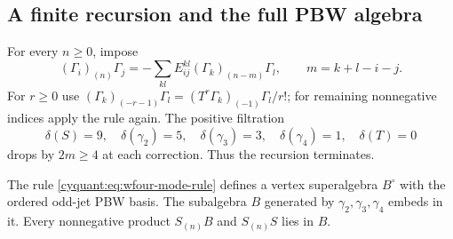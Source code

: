 \subsection{A finite recursion and the full PBW algebra}

For every $n\geq0$, impose
\begin{equation}\label{cyquant:eq:wfour-mode-rule}
 (\Gamma_i)_{(n)}\Gamma_j
   =-\sum_{kl}E_{ij}^{kl}(\Gamma_k)_{(n-m)}\Gamma_l,
       \qquad m=k+l-i-j.
\end{equation}
For $r\geq0$ use
$(\Gamma_k)_{(-r-1)}\Gamma_l=(T^r\Gamma_k)_{(-1)}\Gamma_l/r!$;
for remaining nonnegative indices apply the rule again.  The positive
filtration
\[
 \delta(S)=9,\quad\delta(\gamma_2)=5,\quad
 \delta(\gamma_3)=3,\quad\delta(\gamma_4)=1,\quad\delta(T)=0
\]
drops by $2m\geq4$ at each correction.  Thus the recursion terminates.

\begin{proposition}\label{cyquant:prop:wfour-pbw}
The rule \eqref{cyquant:eq:wfour-mode-rule} defines a vertex
superalgebra $B^\circ$ with the ordered odd-jet PBW basis.  The
subalgebra $B$ generated by $\gamma_2,\gamma_3,\gamma_4$ embeds in it.
Every nonnegative product $S_{(n)}B$ and $S_{(n)}S$ lies in $B$.
\end{proposition}

